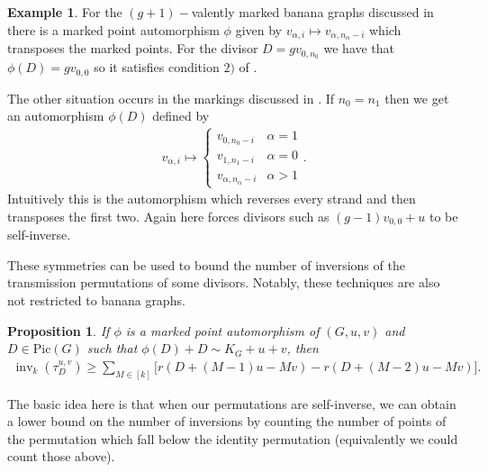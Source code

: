 \documentclass[11pt]{article}
\newtheorem{prop}[theo]{Proposition}
\theoremstyle{definition}
\newtheorem{example}[theo]{Example}
\numberwithin{equation}{section}
\newcommand{\pic}[1]{\mathrm{Pic}\left({#1}\right)}
\newcommand{\inv}{\operatorname{inv}}
\newcommand{\tauD}{\tau^{u,v}_D}
\begin{document}
\begin{example}
    For the $(g+1)-$valently marked banana graphs discussed in  there is a marked point automorphism $\phi$ given by $v_{\alpha,i}\mapsto v_{\alpha,n_\alpha-i}$ which transposes the marked points. For the divisor $D = gv_{0,n_0}$ we have that $\phi(D) = gv_{0,0}$ so it satisfies condition $2)$ of .

    The other situation  occurs in the markings discussed in . If $n_0 = n_1$ then we get an automorphism $\phi(D)$ defined by
    \begin{align*}
        v_{\alpha,i}\mapsto \begin{cases}
            v_{0,n_0-i} & \alpha  = 1\\
            v_{1,n_1-i} & \alpha  = 0\\
            v_{\alpha,n_\alpha-i} & \alpha>1
        \end{cases}.
    \end{align*}
    Intuitively this is the automorphism which reverses every strand and then transposes the first two. Again here  forces divisors such as $(g-1)v_{0,0}+u$ to be self-inverse.
\end{example}

These symmetries can be used to bound the number of inversions of the transmission permutations of some divisors. Notably, these techniques are also not restricted to banana graphs.
\begin{prop}
    If $\phi$ is a marked point automorphism of $(G,u,v)$ and $D \in \pic{G}$ such that $\phi(D) + D \sim K_G + u + v$, then
    \begin{align*}
        \inv_k(\tauD) \geq \sum_{M \in [k]} \Big[ r(D+(M-1)u-Mv) - r(D+(M-2)u-Mv) \Big].
    \end{align*}
\end{prop}

The basic idea here is that when our permutations are self-inverse, we can obtain a lower bound on the number of inversions by counting the number of points of the permutation which fall below the identity permutation (equivalently we could count those above).
\end{document}

